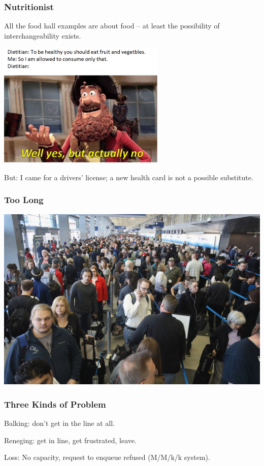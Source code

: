\begin{frame}
\frametitle{Nutritionist}

All the food hall examples are about food -- at least the possibility of interchangeability exists.

\begin{center}
	\includegraphics[width=0.6\textwidth]{images/dietitian.png}
\end{center}

But: I came for a drivers' license; a new health card is not a possible substitute.

\end{frame}


\begin{frame}
\frametitle{Too Long}

\begin{center}
	\includegraphics[width=\textwidth]{images/longline.jpg}
\end{center}


\end{frame}



\begin{frame}
\frametitle{Three Kinds of Problem}

Balking: don't get in the line at all.


Reneging: get in line, get frustrated, leave.


Loss: No capacity, request to enqueue refused (M/M/k/k system).


\end{frame}


